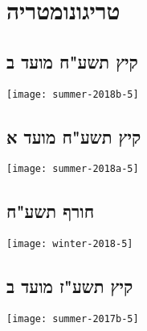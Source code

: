 


\chapter{טריגונומטריה}


\section{קיץ תשע"ח מועד ב}

\begin{center}
\texttt{[image: summer-2018b-5]}
\end{center}

\np

\section{קיץ תשע"ח מועד א}

\begin{center}
\texttt{[image: summer-2018a-5]}
\end{center}

\np

\section{חורף תשע"ח}

\begin{center}
\texttt{[image: winter-2018-5]}
\end{center}

\np

\section{קיץ תשע"ז מועד ב}

\begin{center}
\texttt{[image: summer-2017b-5]}
\end{center}

\vspace{-1ex}

